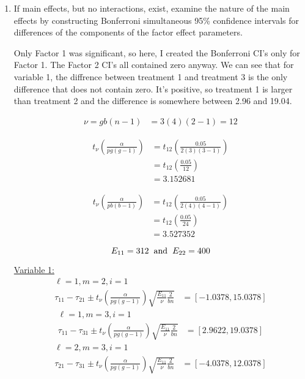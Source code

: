 \begin{enumerate}[label= (\alph*)]
    \item If main effects, but no interactions, exist, examine the nature of the main effects by
    constructing Bonferroni simultaneous 95\% confidence intervals for differences of
    the components of the factor effect parameters.

    Only Factor 1 was significant, so here, I created the Bonferroni CI's only for Factor 1. 
    The Factor 2 CI's all contained zero anyway. We can see that for variable 1, the diffrence between treatment 1 and treatment 3 is the only difference that does not contain zero. It's positive, so treatment 1 is larger than treatment 2 and the difference is somewhere between 2.96 and 19.04.

    \begin{align*}
        \nu = gb(n-1) & = 3(4)(2-1) = 12
    \end{align*}

    \begin{align*}
        t_{\nu} \left( \frac{\alpha}{pg(g-1)} \right)
        & =
        t_{12} \left( \frac{0.05}{2(3)(3-1)} \right)
        \\
        & =
        t_{12} \left( \frac{0.05}{12} \right)
        \\
        & =
        3.152681
    \end{align*}

    \begin{align*}
        t_{\nu} \left( \frac{\alpha}{pb(b-1)} \right)
        & =
        t_{12} \left( \frac{0.05}{2(4)(4-1)} \right)
        \\
        & =
        t_{12} \left( \frac{0.05}{24} \right)
        \\
        & =
        3.527352
    \end{align*}

    \[
        E_{11} = 312
        \hspace{0.20cm}
        \text{and}
        \hspace{0.20cm}
        E_{22} = 400
    \]

    \underline{Variable 1:}
    \begin{align*}
        \ell=1, m=2, i=1
        &
        \\
        \tau_{11} - \tau_{21} \pm t_{\nu} \left( \frac{\alpha}{pg(g-1)} \right) \sqrt{\frac{E_{11}}{\nu}\frac{2}{bn}}
        & = [-1.0378, 15.0378]
    \end{align*}
    \begin{align*}
        \ell=1, m=3, i=1
        &
        \\
        \tau_{11} - \tau_{31} \pm t_{\nu} \left( \frac{\alpha}{pg(g-1)} \right) \sqrt{\frac{E_{11}}{\nu}\frac{2}{bn}}
        & = [2.9622, 19.0378]
    \end{align*}
    \begin{align*}
        \ell=2, m=3, i=1
        &
        \\
        \tau_{21} - \tau_{31} \pm t_{\nu} \left( \frac{\alpha}{pg(g-1)} \right) \sqrt{\frac{E_{11}}{\nu}\frac{2}{bn}}
        & = [-4.0378, 12.0378]
    \end{align*}


\end{enumerate}
